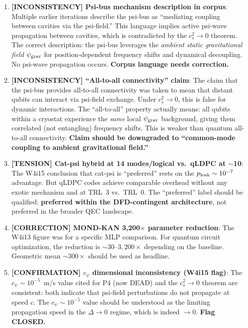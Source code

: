 \documentclass[11pt]{article}
\theoremstyle{definition}
\theoremstyle{remark}
\newcommand{\psigrav}{\psi_{\rm grav}}
\begin{document}
\begin{tcolorbox}[colback=red!5!white, colframe=red!60!black,
  title=\textbf{INCONSISTENCIES AND CORRECTIONS}]

\begin{enumerate}

\item \textbf{[INCONSISTENCY] Psi-bus mechanism description in corpus}:
  Multiple earlier iterations describe the psi-bus as ``mediating coupling
  between cavities via the psi-field.''  This language implies active
  psi-wave propagation between cavities, which is contradicted by the
  $c_s^2 \to 0$ theorem.  The correct description: the psi-bus leverages
  the \emph{ambient static gravitational field} $\psigrav$ for position-dependent
  frequency shifts and dynamical decoupling.  No psi-wave propagation occurs.
  \textbf{Corpus language needs correction.}

\item \textbf{[INCONSISTENCY] ``All-to-all connectivity'' claim}:
  The claim that the psi-bus provides all-to-all connectivity was taken
  to mean that distant qubits can interact via psi-field exchange.  Under
  $c_s^2 \to 0$, this is false for dynamic interactions.  The ``all-to-all''
  property actually means: all qubits within a cryostat experience the
  \emph{same} local $\psigrav$ background, giving them correlated (not
  entangling) frequency shifts.  This is weaker than quantum all-to-all
  connectivity.  \textbf{Claim should be downgraded to ``common-mode
  coupling to ambient gravitational field.''}

\item \textbf{[TENSION] Cat-psi hybrid at 14 modes/logical vs.\ qLDPC
  at $\sim$10}: The W4i15 conclusion that cat-psi is ``preferred'' rests
  on the $p_{\rm leak} \sim 10^{-7}$ advantage.  But qLDPC codes achieve
  comparable overhead without any exotic mechanism and at TRL~3 vs.\ TRL~0.
  The ``preferred'' label should be qualified: \textbf{preferred within the
  DFD-contingent architecture}, not preferred in the broader QEC landscape.

\item \textbf{[CORRECTION] MOND-KAN 3,200$\times$ parameter reduction}:
  The W4i13 figure was for a specific MLP comparison.  For quantum circuit
  optimization, the reduction is $\sim 30$--$3,200\times$ depending on the
  baseline.  Geometric mean $\sim 300\times$ should be used as headline.

\item \textbf{[CONFIRMATION] $c_\psi$ dimensional inconsistency (W4i15
  flag)}: The $c_\psi \sim 10^{-5}$~m/s value cited for P4 (now DEAD) and
  the $c_s^2 \to 0$ theorem are consistent: both indicate that psi-field
  perturbations do not propagate at speed $c$.  The $c_\psi \sim 10^{-5}$
  value should be understood as the limiting propagation speed in the
  $\Delta \to 0$ regime, which is indeed $\to 0$.  \textbf{Flag CLOSED.}

\end{enumerate}
\end{tcolorbox}
\end{document}
